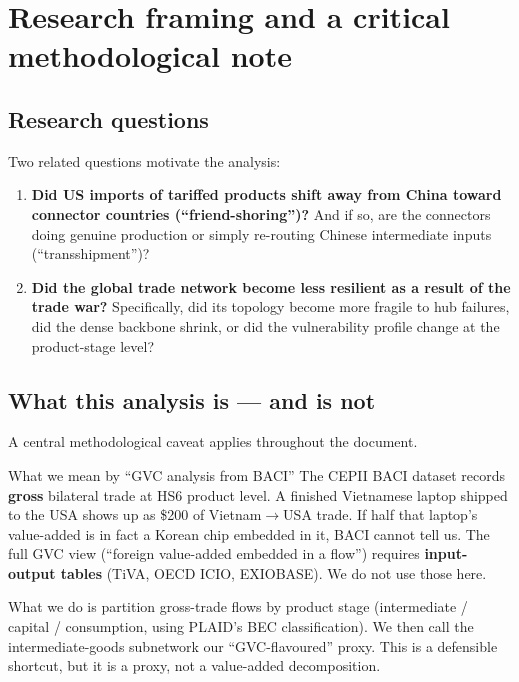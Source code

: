 \documentclass[11pt,a4paper]{article}
\begin{document}
\section{Research framing and a critical methodological note}

\subsection{Research questions}

Two related questions motivate the analysis:

\begin{enumerate}[label=(\arabic*),leftmargin=*]
  \item \textbf{Did US imports of tariffed products shift away from China toward
        connector countries (``friend-shoring'')?} And if so, are the
        connectors doing genuine production or simply re-routing Chinese
        intermediate inputs (``transshipment'')?
  \item \textbf{Did the global trade network become less resilient as a result
        of the trade war?} Specifically, did its topology become more fragile
        to hub failures, did the dense backbone shrink, or did the
        vulnerability profile change at the product-stage level?
\end{enumerate}

\subsection{What this analysis is — and is not}

A central methodological caveat applies throughout the document.

\begin{glossbox}{What we mean by ``GVC analysis from BACI''}
The CEPII BACI dataset records \textbf{gross} bilateral trade at HS6 product
level. A finished Vietnamese laptop shipped to the USA shows up as
\$200 of Vietnam$\to$USA trade. If half that laptop's value-added is in fact
a Korean chip embedded in it, BACI cannot tell us. The full GVC view
(``foreign value-added embedded in a flow'') requires \textbf{input-output tables}
(TiVA, OECD ICIO, EXIOBASE). We do not use those here.

What we do is partition gross-trade flows by product stage (intermediate /
capital / consumption, using PLAID's BEC classification). We then call the
intermediate-goods subnetwork our ``GVC-flavoured'' proxy. This is a defensible
shortcut, but it is a proxy, not a value-added decomposition.
\end{glossbox}
\end{document}
